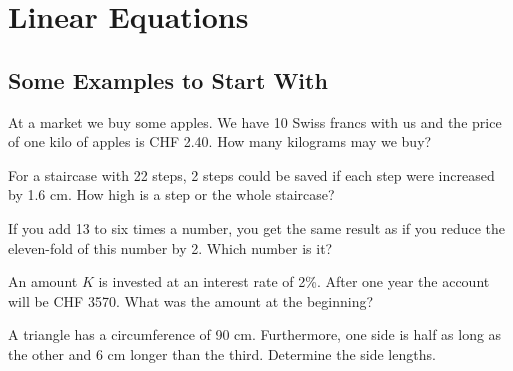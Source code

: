 \section{Linear Equations}

\subsection{Some Examples to Start With}
\begin{exer}
At a market we buy some apples. We have 10 Swiss francs with us and the price of one kilo of apples is CHF 2.40. How many kilograms may we buy?
\end{exer}
\vspace{5\baselineskip}

\begin{exer}
 For a staircase with 22 steps, 2 steps could be saved if each step were increased by 1.6 cm. How high is a step or the whole staircase? 
\end{exer}
\vspace{5\baselineskip}



\begin{exer}
If you add 13 to six times a number, you get the same result as if you reduce the eleven-fold of this number by 2. Which number is it?
\end{exer}
\vspace{5\baselineskip}

\begin{exer}
An amount $K$ is invested at an interest rate of 2\%. After one year the account will be CHF 3570. What was the amount at the beginning?
\end{exer}
\vspace{5\baselineskip}


\begin{exer}
A triangle has a circumference of 90 cm. Furthermore, one side is half as long as the other and 6 cm longer than the third. Determine the side lengths. 
\end{exer}
\vspace{5\baselineskip}


